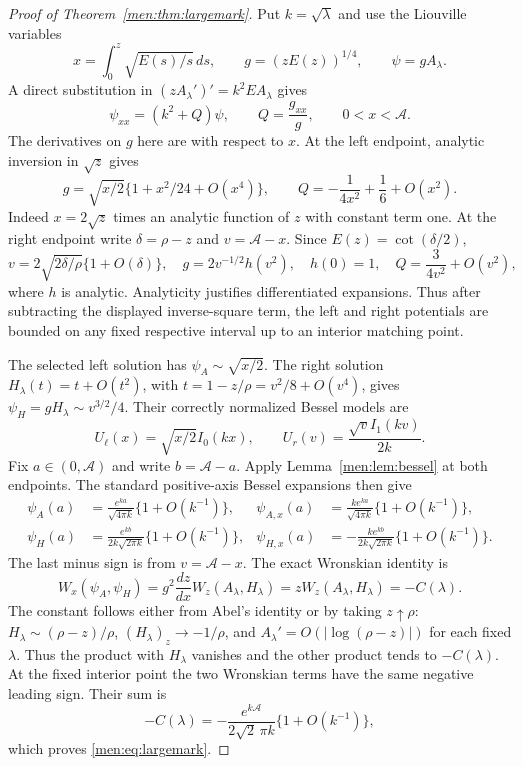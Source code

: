 \documentclass[11pt,letterpaper]{article}
\theoremstyle{remark}\newtheorem{remark}[theorem]{Remark}
\begin{document}
\begin{proof}[Proof of Theorem~\ref{men:thm:largemark}]
Put $k=\sqrt\lambda$ and use the Liouville variables
\begin{equation}\label{men:eq:liouville}
 x=\int_0^z\sqrt{E(s)/s}\,ds,\qquad
 g=(zE(z))^{1/4},\qquad \psi=gA_\lambda.
\end{equation}
A direct substitution in $(zA_\lambda')'=k^2EA_\lambda$ gives
\[
 \psi_{xx}=(k^2+Q)\psi,\qquad Q=\frac{g_{xx}}g,
 \qquad 0<x<\mathcal A.
\]
The derivatives on $g$ here are with respect to $x$. At the left endpoint, analytic inversion in $\sqrt z$ gives
\begin{equation}\label{men:eq:leftQ}
 g=\sqrt{x/2}\{1+x^2/24+O(x^4)\},\qquad
 Q=-\frac1{4x^2}+\frac16+O(x^2).
\end{equation}
Indeed $x=2\sqrt z$ times an analytic function of $z$ with constant term one. At the right endpoint write $\delta=\rho-z$ and $v=\mathcal A-x$. Since $E(z)=\cot(\delta/2)$,
\begin{equation}\label{men:eq:rightQ}
 v=2\sqrt{2\delta/\rho}\{1+O(\delta)\},\quad
 g=2v^{-1/2}h(v^2),\quad h(0)=1,\quad
 Q=\frac3{4v^2}+O(v^2),
\end{equation}
where $h$ is analytic. Analyticity justifies differentiated expansions. Thus after subtracting the displayed inverse-square term, the left and right potentials are bounded on any fixed respective interval up to an interior matching point.

The selected left solution has $\psi_A\sim\sqrt{x/2}$. The right solution $H_\lambda(t)=t+O(t^2)$, with $t=1-z/\rho=v^2/8+O(v^4)$, gives $\psi_H=gH_\lambda\sim v^{3/2}/4$. Their correctly normalized Bessel models are
\[
 U_\ell(x)=\sqrt{x/2}I_0(kx),\qquad
 U_r(v)=\frac{\sqrt v I_1(kv)}{2k}.
\]
Fix $a\in(0,\mathcal A)$ and write $b=\mathcal A-a$. Apply Lemma~\ref{men:lem:bessel} at both endpoints. The standard positive-axis Bessel expansions then give
\begin{align*}
 \psi_A(a)&=\frac{e^{ka}}{\sqrt{4\pi k}}\{1+O(k^{-1})\},&
 \psi_{A,x}(a)&=\frac{k e^{ka}}{\sqrt{4\pi k}}\{1+O(k^{-1})\},\\
 \psi_H(a)&=\frac{e^{kb}}{2k\sqrt{2\pi k}}\{1+O(k^{-1})\},&
 \psi_{H,x}(a)&=-\frac{k e^{kb}}{2k\sqrt{2\pi k}}\{1+O(k^{-1})\}.
\end{align*}
The last minus sign is from $v=\mathcal A-x$. The exact Wronskian identity is
\[
 W_x(\psi_A,\psi_H)=g^2\frac{dz}{dx}W_z(A_\lambda,H_\lambda)
                  =zW_z(A_\lambda,H_\lambda)=-C(\lambda).
\]
The constant follows either from Abel's identity or by taking $z\uparrow\rho$: $H_\lambda\sim(\rho-z)/\rho$, $(H_\lambda)_z\to-1/\rho$, and $A_\lambda'=O(|\log(\rho-z)|)$ for each fixed $\lambda$. Thus the product with $H_\lambda$ vanishes and the other product tends to $-C(\lambda)$. At the fixed interior point the two Wronskian terms have the same negative leading sign. Their sum is
\[
 -C(\lambda)=-\frac{e^{k\mathcal A}}{2\sqrt2\,\pi k}\{1+O(k^{-1})\},
\]
which proves \eqref{men:eq:largemark}.
\end{proof}
\end{document}
